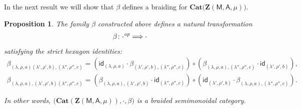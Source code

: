 \documentclass[12pt,reqno]{amsart}
\theoremstyle{plain}
\newtheorem{proposition}[theorem]{Proposition}
\theoremstyle{definition}
\theoremstyle{remark}
\newcommand{\A}{\ensuremath{\mathsf{A}}}
\newcommand{\id}{\ensuremath{\mathsf{id}}}
\newcommand{\MM}{\ensuremath{\mathsf{M}}}
\newcommand{\ZC}{\ensuremath{\mathbf{Z}}}
\newcommand{\Cat}{\ensuremath{\mathbf{Cat}}}
\numberwithin{equation}{section}
\begin{document}
In the next result we will show that $\beta$ defines a braiding for $\Cat\big(\ZC(\MM,\A,\mu)\big)$.
\begin{proposition}
	The family $\beta$ constructed above defines a natural transformation 
	\[\beta\colon \cdot^{\text{\emph{op}}} \Longrightarrow \cdot\] satisfying the strict hexagon identities:
	\begin{gather}
	\label{braid1}	\beta_{(\lambda,\rho,a)(\lambda',\rho',b),(\lambda'',\rho'',c)}=(\id_{(\lambda,\rho,a)}\cdot \beta_{(\lambda',\rho',b),(\lambda'',\rho'',c)})\circ (\beta_{(\lambda,\rho,a),(\lambda'',\rho'',c)}\cdot \id_{(\lambda',\rho',b)}),\\\label{braid2}
		\beta_{(\lambda,\rho,a),(\lambda',\rho',b)(\lambda'',\rho'',c)}=(\beta_{(\lambda,\rho,a),(\lambda',\rho',b)}\cdot \id_{(\lambda'',\rho'',c)})\circ ( \id_{(\lambda',\rho',b)}\cdot \beta_{(\lambda,\rho,a),(\lambda'',\rho'',c)}).
	\end{gather}
	
	In other words, $\big(\Cat(\ZC(\MM,\A,\mu)),\cdot,\beta\big)$ is a braided semimonoidal category.
\end{proposition}
\end{document}
